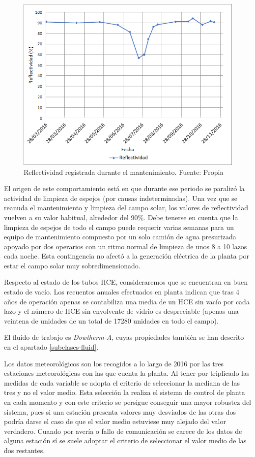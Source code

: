 \begin{figure}[H]
\includegraphics[width=0.9\linewidth]{images/reflectividad.png}
\caption[Reflectividad registrada durante el mantenimiento]{Reflectividad registrada durante el mantenimiento. Fuente: Propia} 
\label{fig:reflectividad}
\end{figure}

El origen de este comportamiento está en que durante ese periodo se paralizó la actividad de limpieza de espejos (por causas indeterminadas). Una vez que se reanuda el mantenimiento y limpieza del campo solar, los valores de reflectividad vuelven a su valor habitual, alrededor del 90\%. Debe tenerse en cuenta que la limpieza de espejos de todo el campo puede requerir varias semanas para un equipo de mantenimiento compuesto por un solo camión de agua presurizada apoyado por dos operarios con un ritmo normal de limpieza de unos 8 a 10 lazos cada noche. Esta contingencia no afectó a la generación eléctrica de la planta por estar el campo solar muy sobredimensionado.

Respecto al estado de los tubos HCE, consideraremos que se encuentran en buen estado de vacío. Los recuentos anuales efectuados en planta indican que tras 4 años de operación apenas se contabiliza una media de un HCE sin vacío por cada lazo y el número de HCE sin envolvente de vidrio es despreciable (apenas una veintena de unidades de un total de 17280 unidades en todo el campo).

El fluido de trabajo es \emph{Dowtherm-A}, cuyas propiedades también se han descrito en el apartado \ref{subclases-fluid}.

Los datos meteorológicos son los recogidos a lo largo de 2016 por las tres estaciones meteorológicas con las que cuenta la planta. Al tener por triplicado las medidas de cada variable se adopta el criterio de seleccionar la mediana de las tres y no el valor medio. Esta selección la realiza el sistema de control de planta en cada momento y con este criterio se persigue conseguir una mayor robustez del sistema, pues si una estación presenta valores muy desviados de las otras dos podría darse el caso de que el valor medio estuviese muy alejado del valor  verdadero. Cuando por avería o fallo de comunicación se carece de los datos de alguna estación sí se suele adoptar el criterio de seleccionar el valor medio de las dos restantes.

